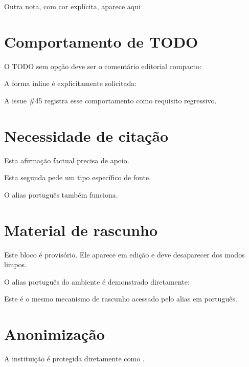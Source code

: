 \documentclass[11pt]{article}
\begin{document}
Outra nota, com cor explícita, aparece aqui
.

\section{Comportamento de TODO}

O TODO sem opção deve ser o comentário editorial compacto:

A forma inline é explicitamente solicitada:

A issue \#45 registra esse comportamento como requisito regressivo.

\section{Necessidade de citação}

Esta afirmação factual precisa de apoio.\pleasecite

Esta segunda pede um tipo específico de fonte.

O alias português também funciona.

\section{Material de rascunho}

\begin{cwdraft}
Este bloco é provisório. Ele aparece em edição e deve desaparecer dos modos limpos.
\end{cwdraft}

O alias português do ambiente é demonstrado diretamente:

\begin{rascunho}
Este é o mesmo mecanismo de rascunho acessado pelo alias em português.
\end{rascunho}

\section{Anonimização}

A instituição é protegida diretamente como
.
\end{document}
